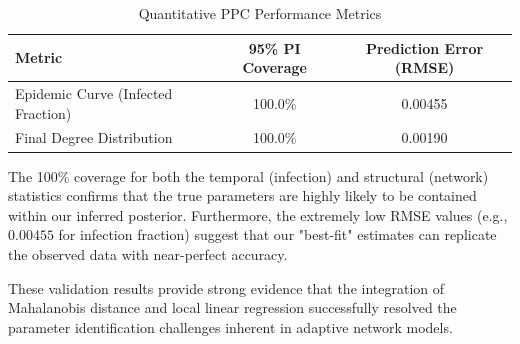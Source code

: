 \begin{table}[H]
\centering
\caption{Quantitative PPC Performance Metrics}
\label{tab:ppc_results}
\begin{tabular}{lcc}
\toprule
Metric & 95\% PI Coverage & Prediction Error (RMSE) \\
\midrule
Epidemic Curve (Infected Fraction) & 100.0\% & 0.00455 \\
Final Degree Distribution & 100.0\% & 0.00190 \\
\bottomrule
\end{tabular}
\end{table}

The 100\% coverage for both the temporal (infection) and structural (network) statistics confirms that the true parameters are highly likely to be contained within our inferred posterior.
Furthermore, the extremely low RMSE values (e.g., $0.00455$ for infection fraction) suggest that our "best-fit" estimates can replicate the observed data with near-perfect accuracy.

These validation results provide strong evidence that the integration of Mahalanobis distance and local linear regression successfully resolved the parameter identification challenges inherent in adaptive network models.